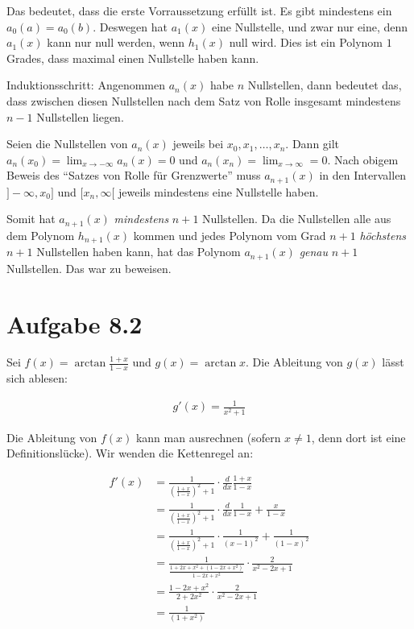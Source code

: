 \documentclass[a4paper,german,12pt,smallheadings]{scrartcl}
\begin{document}
Das bedeutet, dass die erste Vorraussetzung erfüllt ist. Es gibt mindestens ein
$a_0(a) = a_0(b)$. Deswegen hat $a_1(x)$ eine Nullstelle, und zwar nur eine,
denn $a_1(x)$ kann nur null werden, wenn $h_1(x)$ null wird. Dies ist ein
Polynom $1$ Grades, dass maximal einen Nullstelle haben kann.

Induktionsschritt: Angenommen $a_n(x)$ habe $n$ Nullstellen, dann bedeutet das,
dass zwischen diesen Nullstellen nach dem Satz von Rolle insgesamt mindestens $n-1$
Nullstellen liegen.

Seien die Nullstellen von $a_n(x)$ jeweils bei $x_0, x_1, \dots, x_n$. Dann
gilt $a_n(x_0) = \lim_{x \to -\infty} a_n(x) = 0$ und $a_n(x_n) = \lim_{x \to
\infty} = 0$. Nach obigem Beweis des ``Satzes von Rolle für Grenzwerte'' muss
$a_{n+1}(x)$ in den Intervallen $]-\infty,x_0]$ und $[x_n,\infty[$ jeweils
mindestens eine Nullstelle haben.

Somit hat $a_{n+1}(x)$ \textit{mindestens} $n+1$ Nullstellen. Da die
Nullstellen alle aus dem Polynom $h_{n+1}(x)$ kommen und jedes Polynom vom Grad
$n+1$ \textit{höchstens} $n+1$ Nullstellen haben kann, hat das Polynom
$a_{n+1}(x)$ \textit{genau} $n+1$ Nullstellen. Das war zu beweisen.

\section*{Aufgabe 8.2}
Sei $f(x) = \arctan \frac{1+x}{1-x}$ und $g(x) = \arctan x$. Die Ableitung von
$g(x)$ lässt sich ablesen:

\begin{align*}
  g'(x) = \frac{1}{x^2+1}
\end{align*}

Die Ableitung von $f(x)$ kann man ausrechnen (sofern $x \neq 1$, denn dort ist
eine Definitionslücke). Wir wenden die Kettenregel an:

\begin{align*}
  f'(x) &= \frac{1}{\left(\frac{1+x}{1-x}\right)^2+1} \cdot \frac{d}{dx} \frac{1+x}{1-x} \\
        &= \frac{1}{\left(\frac{1+x}{1-x}\right)^2+1} \cdot \frac{d}{dx} \frac{1}{1-x} + \frac{x}{1-x} \\
        &= \frac{1}{\left(\frac{1+x}{1-x}\right)^2+1} \cdot \frac{1}{(x-1)^2} + \frac{1}{(1-x)^2} \\
        &= \frac{1}{\frac{1+2x+x^2+(1-2x+x^2)}{1-2x+x^2}} \cdot \frac{2}{x^2-2x+1} \\
        &= \frac{1-2x+x^2}{2+2x^2} \cdot \frac{2}{x^2-2x+1} \\
        &= \frac{1}{(1+x^2)} \\
\end{align*}
\end{document}
